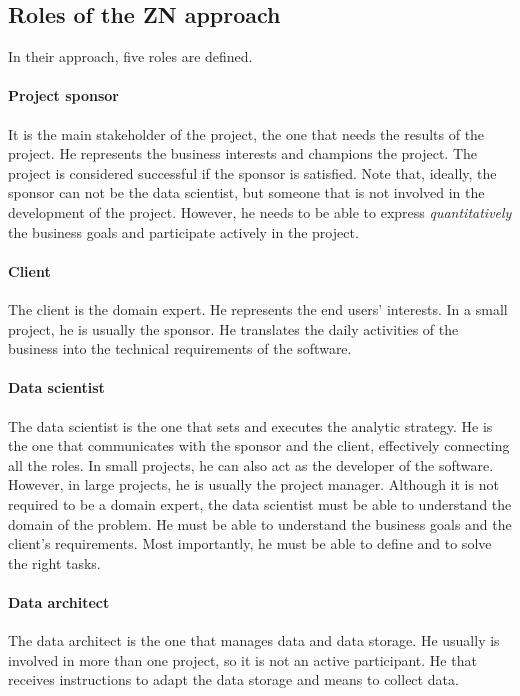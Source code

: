 \subsection{Roles of the ZN approach}

In their approach, five roles are defined.

\paragraph{Project sponsor}  It is the main stakeholder of the project, the one that needs the
results of the project.  He represents the business interests and champions the project.
The project is considered successful if the sponsor is satisfied.  Note that, ideally, the
sponsor can not be the data scientist, but someone that is not involved in the development
of the project.  However, he needs to be able to express \emph{quantitatively} the business
goals and participate actively in the project.

\paragraph{Client}  The client is the domain expert.  He represents the end users'
interests.  In a small project, he is usually the sponsor.  He translates the daily
activities of the business into the technical requirements of the software.

\paragraph{Data scientist}  The data scientist is the one that sets and executes the
analytic strategy.  He is the one that communicates with the sponsor and the client,
effectively connecting all the roles.  In small projects, he can also act as the developer
of the software.  However, in large projects, he is usually the project manager.
Although it is not required to be a domain expert, the data scientist must be able to
understand the domain of the problem.  He must be able to understand the business goals and
the client's requirements.  Most importantly, he must be able to define and to solve the
right tasks.

\paragraph{Data architect}  The data architect is the one that manages data and data storage.
He usually is involved in more than one project, so it is not an active participant.  He
that receives instructions to adapt the data storage and means to collect data.

